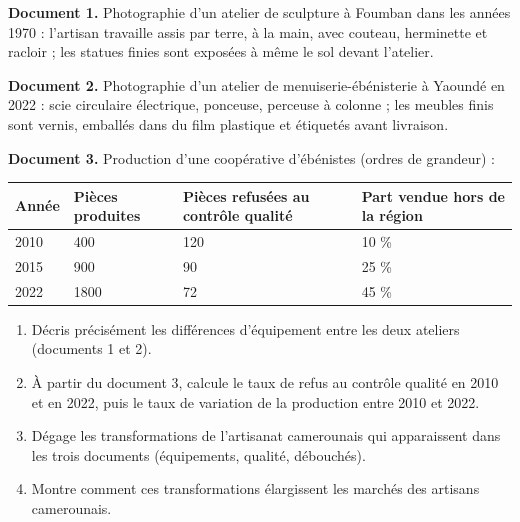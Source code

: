 \documentclass[11pt]{article}
\begin{document}
\begin{exercice}
\textbf{Document 1.} Photographie d'un atelier de sculpture à Foumban dans les années 1970 : l'artisan travaille assis par terre, à la main, avec couteau, herminette et racloir ; les statues finies sont exposées à même le sol devant l'atelier.

\textbf{Document 2.} Photographie d'un atelier de menuiserie-ébénisterie à Yaoundé en 2022 : scie circulaire électrique, ponceuse, perceuse à colonne ; les meubles finis sont vernis, emballés dans du film plastique et étiquetés avant livraison.

\textbf{Document 3.} Production d'une coopérative d'ébénistes (ordres de grandeur) :

\begin{center}
\begin{tabularx}{\linewidth}{|l|X|X|X|}
\hline
\rowcolor{popblueL} Année & Pièces produites & Pièces refusées au contrôle qualité & Part vendue hors de la région \\
\hline
2010 & 400 & 120 & 10 \% \\
\hline
2015 & 900 & 90 & 25 \% \\
\hline
2022 & 1800 & 72 & 45 \% \\
\hline
\end{tabularx}
\end{center}

\begin{enumerate}
\item Décris précisément les différences d'équipement entre les deux ateliers (documents 1 et 2).
\item À partir du document 3, calcule le taux de refus au contrôle qualité en 2010 et en 2022, puis le taux de variation de la production entre 2010 et 2022.
\item Dégage les transformations de l'artisanat camerounais qui apparaissent dans les trois documents (équipements, qualité, débouchés).
\item Montre comment ces transformations élargissent les marchés des artisans camerounais.
\end{enumerate}
\end{exercice}
\end{document}
